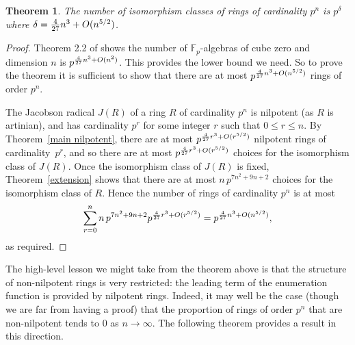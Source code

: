 \documentclass[12pt]{article}
\newtheorem{Thm}{Theorem}[section]
\newcommand{\Oh}{\mathnormal{O}}
\begin{document}
\begin{Thm}
\label{general bound}
The number of isomorphism classes of rings of cardinality $p^{n}$ is $p^{\delta}$ where $\delta = \frac{4}{27}n^{3} + \Oh(n^{5/2})$.
\end{Thm}
\begin{proof} 
Theorem 2.2 of \cite{K & P} shows the number of $\mathbb{F}_{p}$-algebras of cube zero and dimension $n$ is $p^{\frac{4}{27}n^{3} + \Oh(n^2)}$. This provides the lower bound we need. So to prove the theorem it is sufficient to show that there are at most $p^{\frac{4}{27}n^{3} + \Oh(n^{5/2})}$ rings of order $p^{n}$.

The Jacobson radical $J(R)$ of a ring $R$ of cardinality $p^n$ is nilpotent (as $R$ is artinian), and has cardinality $p^r$ for some integer $r$ such that $0\leq r\leq n$. By Theorem~\ref{main nilpotent}, there are at most $p^{\frac{4}{27}r^3+\Oh(r^{5/2})}$ nilpotent rings of cardinality~$p^r$, and so there are at most $p^{\frac{4}{27}r^3+\Oh(r^{5/2})}$ choices for the isomorphism class of $J(R)$. Once the isomorphism class of $J(R)$ is fixed, Theorem~\ref{extension} shows that there are at most $n\, p^{7n^2+9n+2}$ choices for the isomorphism class of $R$. Hence the number of rings of cardinality $p^n$ is at most
\[
\sum_{r=0}^{n} n\, p^{7n^2+9n+2} p^{\frac{4}{27}r^3+\Oh(r^{5/2})} = p^{\frac{4}{27}n^3+\Oh(n^{5/2})},
\]
as required.
\end{proof}

The high-level lesson we might take from the theorem above is that the structure of non-nilpotent rings is very restricted: the leading term of the enumeration function is provided by nilpotent rings. Indeed, it may well be the case (though we are far from having a proof) that the proportion of rings of order $p^n$ that are non-nilpotent tends to $0$ as $n\rightarrow\infty$. The following theorem provides a result in this direction.
\end{document}
